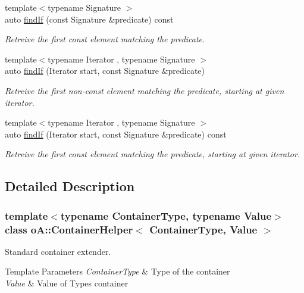 \begin{DoxyCompactItemize}
{\footnotesize template$<$typename Signature $>$ }\\auto \mbox{\hyperlink{classo_a_1_1_container_helper_accea76cd23603fc42db7b46081f5cc8d}{find\+If}} (const Signature \&predicate) const
\begin{DoxyCompactList}\small\item\em Retreive the first const element matching the predicate. \end{DoxyCompactList}\item 
{\footnotesize template$<$typename Iterator , typename Signature $>$ }\\auto \mbox{\hyperlink{classo_a_1_1_container_helper_a65c48f0a1d310ae5bb9d1f04509cf0ff}{find\+If}} (Iterator start, const Signature \&predicate)
\begin{DoxyCompactList}\small\item\em Retreive the first non-\/const element matching the predicate, starting at given iterator. \end{DoxyCompactList}\item 
{\footnotesize template$<$typename Iterator , typename Signature $>$ }\\auto \mbox{\hyperlink{classo_a_1_1_container_helper_a7fdcb06a5193933448ec214640501705}{find\+If}} (Iterator start, const Signature \&predicate) const
\begin{DoxyCompactList}\small\item\em Retreive the first const element matching the predicate, starting at given iterator. \end{DoxyCompactList}\end{DoxyCompactItemize}


\subsection{Detailed Description}
\subsubsection*{template$<$typename Container\+Type, typename Value$>$\newline
class o\+A\+::\+Container\+Helper$<$ Container\+Type, Value $>$}

Standard container extender. 


\begin{DoxyTemplParams}{Template Parameters}
{\em Container\+Type} & Type of the container \\
\hline
{\em Value} & Value of Type\textquotesingle{}s container \\
\hline
\end{DoxyTemplParams}



